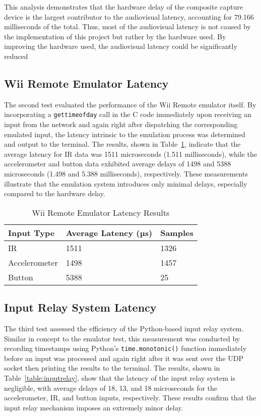 This analysis demonstrates that the hardware delay of the composite capture device is the largest
contributor to the audiovisual latency, accounting for 79.166 milliseconds of the total. Thus, most of the audiovisual latency is not caused by the implementation of this project but rather by the hardware used. By improving the hardware used, the audiovisual latency could be significantly reduced

\subsection{Wii Remote Emulator Latency}

The second test evaluated the performance of the Wii Remote emulator itself. By
incorporating a \texttt{gettimeofday} call in the C code immediately upon receiving an
input from the network and again right after dispatching the corresponding
emulated input, the latency intrinsic to the emulation process was determined and output to the terminal.
The results, shown in Table~\ref{table:emulator}, indicate that the average
latency for IR data was 1511 microseconds (1.511 milliseconds), while the
accelerometer and button data exhibited average delays of 1498 and 5388
microseconds (1.498 and 5.388 milliseconds), respectively. These measurements
illustrate that the emulation system introduces only minimal delays, especially compared to the hardware
delay.


\begin{table}[!ht]
    \centering
    \begin{tabular}{|l|l|l|}
    \hline
        Input Type & Average Latency (µs) & Samples \\ \hline
        IR & 1511 & 1326 \\ \hline
        Accelerometer & 1498 & 1457 \\ \hline
        Button & 5388 & 25 \\ \hline
    \end{tabular}
    \caption{Wii Remote Emulator Latency Results}
    \label{table:emulator}
\end{table}

\subsection{Input Relay System Latency}

The third test assessed the efficiency of the Python-based input relay
system. Similar in concept to the emulator test, this measurement was conducted
by recording timestamps using Python’s \texttt{time.monotonic()} function immediately
before an input was processed and again right after it was sent over the UDP
socket then printing the results to the terminal. The results, shown in
Table~\ref{table:inputrelay}, show that the latency of the input relay system is
negligible, with average delays of 18, 13, and 18 microseconds for the
accelerometer, IR, and button inputs, respectively. These results confirm that the input
relay mechanism imposes an extremely minor delay.

